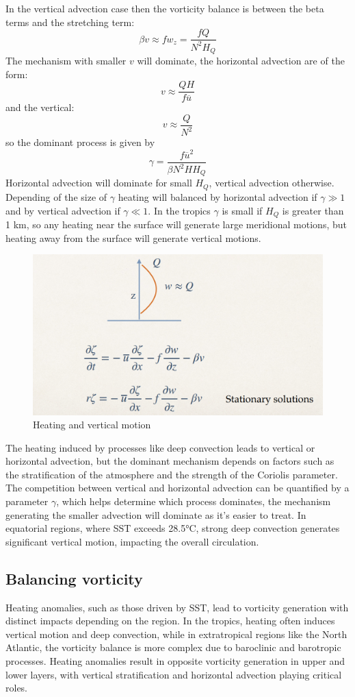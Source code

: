 In the vertical advection case then the vorticity balance is between the beta terms and the stretching term: 
$$\beta v\approx fw_z=\frac{fQ}{N^2H_Q}$$
The mechanism with smaller $v$ will dominate, the horizontal advection are of the form:
$$v\approx\frac{QH}{f\overline{u}}$$
and the vertical: 
$$v\approx\frac{Q}{N^2}$$
so the dominant process is given by
\begin{equation}
    \gamma=\frac{f\overline{u}^2}{\beta N^2HH_Q}
\end{equation}
Horizontal advection will dominate for small $H_Q$, vertical
advection otherwise. Depending of the size of $\gamma$ heating will balanced by horizontal advection if $\gamma \gg 1$ and by vertical advection if $\gamma\ll 1$.
In the tropics $\gamma$ is small if $H_Q$ is greater than 1 km, so any heating near the surface will generate large meridional motions, but heating away from the surface will generate vertical motions.
\begin{figure}[htp!]
    \centering
    \includegraphics[width=0.5\linewidth]{uploads/Screenshot 2024-11-26 105240.png}
    \caption{Heating and vertical motion}
   
\end{figure}


The heating induced by processes like deep convection leads to vertical or horizontal advection, but the dominant mechanism depends on factors such as the stratification of the atmosphere and the strength of the Coriolis parameter. The competition between vertical and horizontal advection can be quantified by a parameter $\gamma$, which helps determine which process dominates, the mechanism generating the smaller advection will dominate as it's easier to treat. In equatorial regions, where SST exceeds 28.5°C, strong deep convection generates significant vertical motion, impacting the overall circulation.

\subsection{Balancing vorticity}
Heating anomalies, such as those driven by SST, lead to vorticity generation with distinct impacts depending on the region. In the tropics, heating often induces vertical motion and deep convection, while in extratropical regions like the North Atlantic, the vorticity balance is more complex due to baroclinic and barotropic processes. Heating anomalies result in opposite vorticity generation in upper and lower layers, with vertical stratification and horizontal advection playing critical roles.

